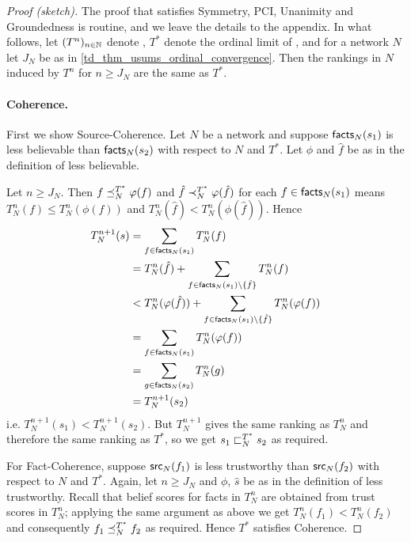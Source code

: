 \begin{proof}[Proof (sketch)]

The proof that \usums{} satisfies Symmetry, PCI, Unanimity and Groundedness is
routine, and we leave the details to the appendix. In what follows, let
$(T^n)_{n \in \mathbb{N}}$ denote \usums{}, $T^*$ denote the ordinal limit of
\usums{}, and for a network $N$ let $J_N$ be as in
\cref{td_thm_usums_ordinal_convergence}. Then the rankings in $N$ induced by $T^n$
for $n \ge J_N$ are the same as $T^*$.

\paragraph{Coherence.}
First we show Source-Coherence. Let $N$ be a network and suppose
$\mathsf{facts}_N(s_1)$ is less believable than $\mathsf{facts}_N(s_2)$ with respect to $N$ and
$T^*$. Let $\phi$ and $\hat{f}$ be as in the definition of less believable.

Let $n \ge J_N$. Then $f \preceq_N^{T^*} \varphi(f)$ and $\hat{f} \prec_N^{T^*}
\varphi(\hat{f})$ for each $f \in \mathsf{facts}_N(s_1)$ means $T_N^n(f) \le
T_N^n(\phi(f))$ and $T_N^n(\hat{f}) < T_N^n(\phi(\hat{f}))$. Hence
\begin{align*}
    T_N^{n+1}(s)
    &= \sum_{f \in \mathsf{facts}_N(s_1)}{T_N^n(f)} \\
    &= T_N^n(\hat{f}) + \sum_{f \in \mathsf{facts}_N(s_1) \setminus \{\hat{f}\}}{T_N^n(f)} \\
    &< T_N^n(\varphi(\hat{f})) + \sum_{f \in \mathsf{facts}_N(s_1) \setminus \{\hat{f}\}}{T_N^n(\varphi(f))} \\
    &= \sum_{f \in \mathsf{facts}_N(s_1)}{T_N^n(\varphi(f))} \\
    &= \sum_{g \in \mathsf{facts}_N(s_2)}{T_N^n(g)} \\
    &= T_N^{n+1}(s_2)
\end{align*}
i.e. $T_N^{n+1}(s_1) < T_N^{n+1}(s_2)$. But $T_N^{n+1}$ gives the same ranking
as $T_N^n$ and therefore the same ranking as $T^*$, so we get $s_1 \sqsubset_N^{T^*}
s_2$ as required.

For Fact-Coherence, suppose $\mathsf{src}_N(f_1)$ is less trustworthy than
$\mathsf{src}_N(f_2)$ with respect to $N$ and $T^*$. Again, let $n \ge J_N$ and $\phi$,
$\hat{s}$ be as in the definition of less trustworthy. Recall that belief
scores for facts in $T_N^n$ are obtained from trust scores in $T_N^n$; applying
the same argument as above we get $T_N^n(f_1) < T_N^n(f_2)$ and consequently
$f_1 \preceq_N^{T^*} f_2$ as required. Hence $T^*$ satisfies Coherence.


\end{proof}
